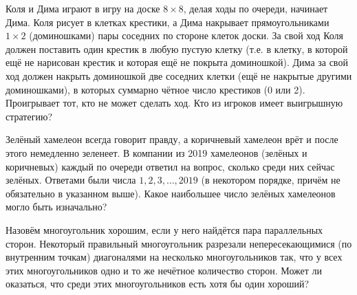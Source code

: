 \documentclass{article}
\begin{document}
\begin{enumerate_boxed}
        \item  Коля и Дима играют в игру на доске $8 \times 8$, делая ходы по очереди, начинает Дима.
        Коля рисует в клетках крестики, а Дима накрывает прямоугольниками $1 \times 2$ (доминошками) пары соседних по стороне клеток доски.
        За свой ход Коля должен поставить один крестик в любую пустую клетку (т.е. в клетку, в которой ещё не нарисован крестик и которая ещё не покрыта доминошкой).
        Дима за свой ход должен накрыть доминошкой две соседних клетки (ещё не накрытые другими доминошками), в которых суммарно чётное число крестиков (0 или 2).
        Проигрывает тот, кто не может сделать ход.
        Кто из игроков имеет выигрышную стратегию?

        \item Зелёный хамелеон всегда говорит правду, а коричневый хамелеон врёт и после этого немедленно зеленеет.
        В компании из 2019 хамелеонов (зелёных и коричневых) каждый по очереди ответил на вопрос, сколько среди них сейчас зелёных.
        Ответами были числа $1, 2, 3, \dotsc, 2019$ (в некотором порядке, причём не обязательно в указанном выше).
        Какое наибольшее число зелёных хамелеонов могло быть изначально?

        \item Назовём многоугольник хорошим, если у него найдётся пара параллельных сторон.
        Некоторый правильный многоугольник разрезали непересекающимися (по внутренним точкам) диагоналями на несколько многоугольников так, что у всех этих многоугольников одно и то же нечётное количество сторон.
        Может ли оказаться, что среди этих многоугольников есть хотя бы один хороший?

    \end{enumerate_boxed}
\end{document}
